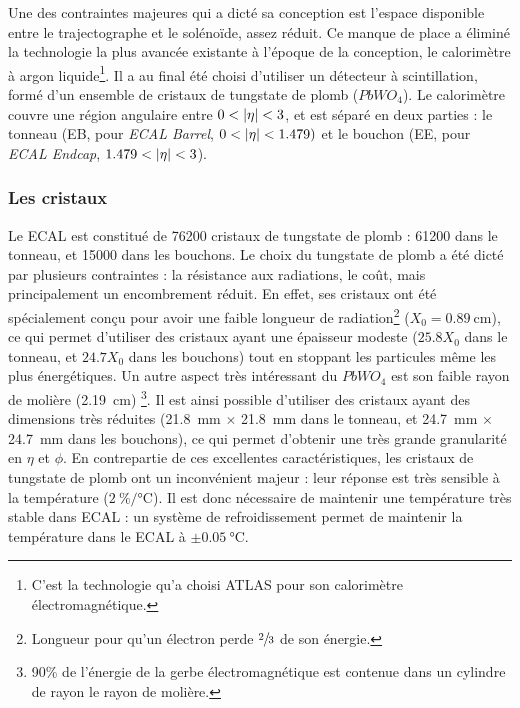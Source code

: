 Une des contraintes majeures qui a dicté sa conception est l'espace disponible entre le trajectographe et le solénoïde, assez réduit. Ce manque de place a éliminé la technologie la plus avancée existante à l'époque de la conception, le calorimètre à argon liquide\footnote{C'est la technologie qu'a choisi ATLAS pour son calorimètre électromagnétique.}. Il a au final été choisi d'utiliser un détecteur à scintillation, formé d'un ensemble de cristaux de tungstate de plomb ($PbWO_4$). Le calorimètre couvre une région angulaire entre $0 < \lvert \eta \rvert < 3$, et est séparé en deux parties : le tonneau (EB, pour \emph{ECAL Barrel}, $0 < \lvert \eta \rvert < \num{1.479})$ et le bouchon (EE, pour \emph{ECAL Endcap}, $\num{1.479} < \lvert \eta \rvert < 3$).

\subsubsection{Les cristaux}

Le ECAL est constitué de 76200 cristaux de tungstate de plomb : 61200 dans le tonneau, et 15000 dans les bouchons. Le choix du tungstate de plomb a été dicté par plusieurs contraintes : la résistance aux radiations, le coût, mais principalement un encombrement réduit. En effet, ses cristaux ont été spécialement conçu pour avoir une faible longueur de radiation\footnote{Longueur pour qu'un électron perde $\sfrac{2}{3}$ de son énergie.} ($X_0 = \SI{0.89}{\cm}$), ce qui permet d'utiliser des cristaux ayant une épaisseur modeste ($\num{25.8}X_0$ dans le tonneau, et $\num{24.7}X_0$ dans les bouchons) tout en stoppant les particules même les plus énergétiques. Un autre aspect très intéressant du $PbWO_4$ est son faible rayon de molière (\SI{2.19}{\cm}) \footnote{90\% de l'énergie de la gerbe électromagnétique est contenue dans un cylindre de rayon le rayon de molière.}. Il est ainsi possible d'utiliser des cristaux ayant des dimensions très réduites (\SI{21.8}{\mm} $\times$ \SI{21.8}{\mm} dans le tonneau, et \SI{24.7}{\mm} $\times$ \SI{24.7}{\mm} dans les bouchons), ce qui permet d'obtenir une très grande granularité en $\eta$ et $\phi$.
En contrepartie de ces excellentes caractéristiques, les cristaux de tungstate de plomb ont un inconvénient majeur : leur réponse est très sensible à la température (\tilde $\SI[per-mode = symbol]{2}{\percent\per\degreeCelsius}$). Il est donc nécessaire de maintenir une température très stable dans ECAL : un système de refroidissement permet de maintenir la température dans le ECAL à $\pm \SI{0.05}{\degreeCelsius}$.

